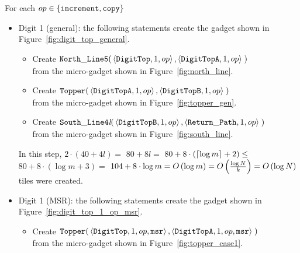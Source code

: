 For each $\inc \in \{ {\tt increment, copy } \}$
\begin{itemize}

        \item Digit 1 (general): the following statements create the gadget shown in Figure~\ref{fig:digit_top_general}.
        \begin{itemize}
            \item Create
            $\begin{aligned}[t]
                {\tt North\_Line5}(& \left \langle {\tt DigitTop},  1, \inc \right\rangle,
                                     \left \langle {\tt DigitTopA}, 1, \inc \right\rangle \;)
            \end{aligned}$\\from the micro-gadget shown in Figure~\ref{fig:north_line}.

            \item Create
            $\begin{aligned}[t]
                {\tt Topper}(& \left \langle {\tt DigitTopA}, 1, \inc \right\rangle,
                               \left \langle {\tt DigitTopB}, 1, \inc \right\rangle \;)
            \end{aligned}$\\from the micro-gadget shown in Figure~\ref{fig:topper_gen}.

            \item Create
            $\begin{aligned}[t]
                {\tt South\_Line4\textit{l}}(& \left\langle {\tt DigitTopB}, 1, \inc \right\rangle,
                                               \left\langle \returnpath,     1, \inc \right\rangle \;)
            \end{aligned}$\\from the micro-gadget shown in Figure~\ref{fig:south_line}.
        \end{itemize}
        In this step, $2 \cdot \left( 40 + 4l \right) =$
        $80 + 8l =$
        $80 + 8 \cdot \left( \ceil*{\log m} + 2 \right) \leq$
        $80 + 8 \cdot \left( {\log m} + 3 \right) =$
        $104 + 8 \cdot {\log m} = \bigologm$ tiles were created.
        \vspace{0.5cm}


        \item Digit 1 (MSR): the following statements create the gadget shown in Figure~\ref{fig:digit_top_1_op_msr}.
        \begin{itemize}
            \item Create
            $\begin{aligned}[t]
                {\tt Topper}(& \left\langle {\tt DigitTop},  1, \inc, {\tt msr} \right\rangle,
                               \left\langle {\tt DigitTopA}, 1, \inc, {\tt msr} \right\rangle \;)
            \end{aligned}$ \\ from the micro-gadget shown in Figure~\ref{fig:topper_case1}.



\end{itemize}
\end{itemize}
